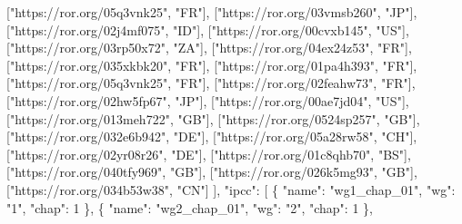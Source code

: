 \documentclass[
]{article}
\newenvironment{Shaded}{}{}
\newcommand{\DataTypeTok}[1]{\textcolor[rgb]{0.56,0.13,0.00}{#1}}
\newcommand{\DecValTok}[1]{\textcolor[rgb]{0.25,0.63,0.44}{#1}}
\newcommand{\FunctionTok}[1]{\textcolor[rgb]{0.02,0.16,0.49}{#1}}
\newcommand{\OtherTok}[1]{\textcolor[rgb]{0.00,0.44,0.13}{#1}}
\newcommand{\StringTok}[1]{\textcolor[rgb]{0.25,0.44,0.63}{#1}}
\begin{document}
\begin{Shaded}
\begin{Highlighting}[]
    \OtherTok{[}\StringTok{"https://ror.org/05q3vnk25"}\OtherTok{,} \StringTok{"FR"}\OtherTok{],}
    \OtherTok{[}\StringTok{"https://ror.org/03vmsb260"}\OtherTok{,} \StringTok{"JP"}\OtherTok{],}
    \OtherTok{[}\StringTok{"https://ror.org/02j4mf075"}\OtherTok{,} \StringTok{"ID"}\OtherTok{],}
    \OtherTok{[}\StringTok{"https://ror.org/00cvxb145"}\OtherTok{,} \StringTok{"US"}\OtherTok{],}
    \OtherTok{[}\StringTok{"https://ror.org/03rp50x72"}\OtherTok{,} \StringTok{"ZA"}\OtherTok{],}
    \OtherTok{[}\StringTok{"https://ror.org/04ex24z53"}\OtherTok{,} \StringTok{"FR"}\OtherTok{],}
    \OtherTok{[}\StringTok{"https://ror.org/035xkbk20"}\OtherTok{,} \StringTok{"FR"}\OtherTok{],}
    \OtherTok{[}\StringTok{"https://ror.org/01pa4h393"}\OtherTok{,} \StringTok{"FR"}\OtherTok{],}
    \OtherTok{[}\StringTok{"https://ror.org/05q3vnk25"}\OtherTok{,} \StringTok{"FR"}\OtherTok{],}
    \OtherTok{[}\StringTok{"https://ror.org/02feahw73"}\OtherTok{,} \StringTok{"FR"}\OtherTok{],}
    \OtherTok{[}\StringTok{"https://ror.org/02hw5fp67"}\OtherTok{,} \StringTok{"JP"}\OtherTok{],}
    \OtherTok{[}\StringTok{"https://ror.org/00ae7jd04"}\OtherTok{,} \StringTok{"US"}\OtherTok{],}
    \OtherTok{[}\StringTok{"https://ror.org/013meh722"}\OtherTok{,} \StringTok{"GB"}\OtherTok{],}
    \OtherTok{[}\StringTok{"https://ror.org/0524sp257"}\OtherTok{,} \StringTok{"GB"}\OtherTok{],}
    \OtherTok{[}\StringTok{"https://ror.org/032e6b942"}\OtherTok{,} \StringTok{"DE"}\OtherTok{],}
    \OtherTok{[}\StringTok{"https://ror.org/05a28rw58"}\OtherTok{,} \StringTok{"CH"}\OtherTok{],}
    \OtherTok{[}\StringTok{"https://ror.org/02yr08r26"}\OtherTok{,} \StringTok{"DE"}\OtherTok{],}
    \OtherTok{[}\StringTok{"https://ror.org/01c8qhb70"}\OtherTok{,} \StringTok{"BS"}\OtherTok{],}
    \OtherTok{[}\StringTok{"https://ror.org/040tfy969"}\OtherTok{,} \StringTok{"GB"}\OtherTok{],}
    \OtherTok{[}\StringTok{"https://ror.org/026k5mg93"}\OtherTok{,} \StringTok{"GB"}\OtherTok{],}
    \OtherTok{[}\StringTok{"https://ror.org/034b53w38"}\OtherTok{,} \StringTok{"CN"}\OtherTok{]}
  \OtherTok{]}\FunctionTok{,}
  \DataTypeTok{"ipcc"}\FunctionTok{:} \OtherTok{[}
    \FunctionTok{\{} \DataTypeTok{"name"}\FunctionTok{:} \StringTok{"wg1\_chap\_01"}\FunctionTok{,} \DataTypeTok{"wg"}\FunctionTok{:} \StringTok{"1"}\FunctionTok{,} \DataTypeTok{"chap"}\FunctionTok{:} \DecValTok{1} \FunctionTok{\}}\OtherTok{,}
    \FunctionTok{\{} \DataTypeTok{"name"}\FunctionTok{:} \StringTok{"wg2\_chap\_01"}\FunctionTok{,} \DataTypeTok{"wg"}\FunctionTok{:} \StringTok{"2"}\FunctionTok{,} \DataTypeTok{"chap"}\FunctionTok{:} \DecValTok{1} \FunctionTok{\}}\OtherTok{,}

\end{Highlighting}
\end{Shaded}
\end{document}
